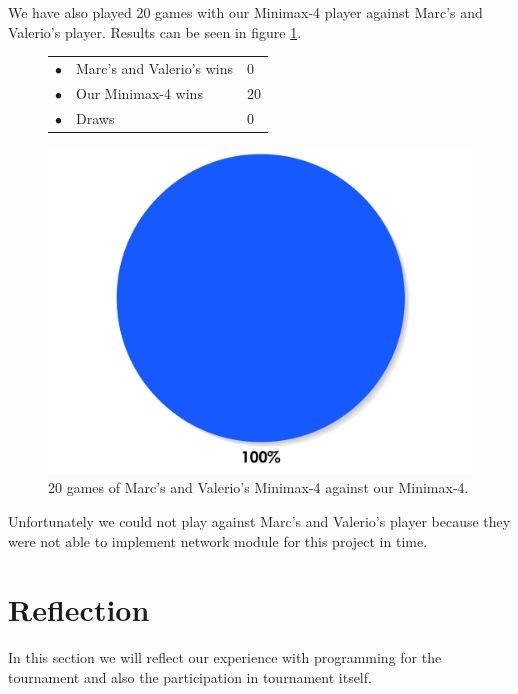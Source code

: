 \documentclass[paper=a4, fontsize=11pt]{article} %
\newcommand{\ra}[1]{\renewcommand{\arraystretch}{#1}}
\begin{document}
We have also played 20 games with our Minimax-4 player against Marc's and Valerio's player.
Results can be seen in figure \ref{fig:tournament2}.
\begin{figure}[ht]
    \begin{minipage}[c]{0.40\linewidth}
        \centering
        \ra{1.3}
        \begin{tabular}{cll}
            \toprule
            \textcolor{red!100}{$\bullet$} & Marc's and Valerio's wins & 0       \\
            \textcolor{blue!100!yellow!100!red!80}{$\bullet$} & Our Minimax-4  wins & 20      \\  
            \textcolor{gray!100}{$\bullet$} & Draws & 0      \\  
            \bottomrule
        \end{tabular}
    \end{minipage}
    \begin{minipage}[c]{0.60\linewidth}
        \centering
    \includegraphics[scale=0.35]{img/tournament2.pdf}
    \end{minipage}
    \caption{20 games of Marc's and Valerio's Minimax-4 against our Minimax-4.}
	\label{fig:tournament2}
\end{figure}


Unfortunately we could not play against Marc's and Valerio's player because they were not able to implement network module for this project in time.


\section{Reflection}
In this section we will reflect our experience with programming for the tournament and also the participation in tournament itself.
\end{document}
